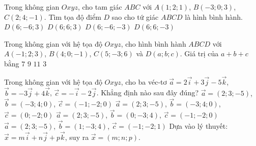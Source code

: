 \begin{ex}%
	Trong không gian $Oxyz$, cho tam giác $ABC$ với $A(1; 2;1)$, $B(-3; 0; 3)$, $C(2;4; -1)$. Tìm tọa độ điểm $D$ sao cho tứ giác $ABCD$ là hình bình hành.
	\choice
	{$D(6;-6;3)$}
	{$D(6;6;3)$}
	{$D(6;-6;-3)$}
	{\True $D(6;6;-3)$}
\end{ex}
\begin{ex}%
	Trong không gian với hệ tọa độ $Oxyz$, cho hình bình hành $ABCD$ với $A(-1;2;3)$, $B(4;0;-1)$, $C(5;-3;6)$ và $D(a;b;c)$. Giá trị của $a+b+c$ bằng
	\choice
	{$7$}
	{\True $9$}
	{$11$}
	{$3$}
\end{ex}
\begin{ex}%
	Trong không gian với hệ tọa độ $Oxyz$, cho ba véc-tơ 
	$\vec{a}=2\vec{i}+3\vec{j}-5\vec{k}$, $\vec{b}=-3\vec{j}+4\vec{k}$, $\vec{c}=-\vec{i}-2\vec{j}$.
	Khẳng định nào sau đây đúng?
	\choice
	{$\vec{a}=(2;3;-5 )$, $\vec{b}=(-3;4;0 )$, $\vec{c}=(-1;-2;0 )$}
	{ $\vec{a}=(2;3;-5 )$, $\vec{b}=(-3;4;0 )$, $\vec{c}=(0;-2;0 )$} 
	{ \True $\vec{a}=(2;3;-5 )$, $\vec{b}=(0;-3;4 )$, $\vec{c}=(-1;-2;0 )$} 
	{ $\vec{a}=(2;3;-5 )$, $\vec{b}=(1;-3;4 )$, $\vec{c}=(-1;-2;1 )$}
	\loigiai
	{Dựa vào lý thuyết: $\vec{x}=m\vec{i}+n\vec{j}+p\vec{k}$, suy ra $\vec{x}=(m;n;p )$.}
\end{ex}
